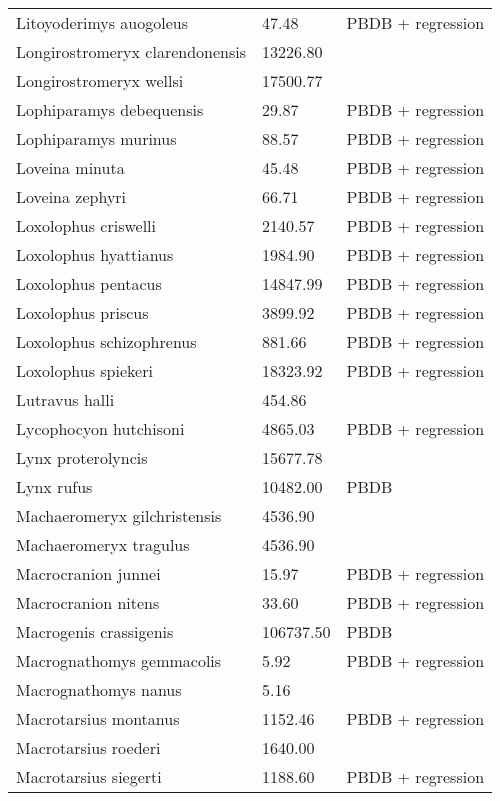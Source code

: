 \documentclass{article}
\begin{document}
\begin{center}
\begin{longtable}{p{} p{} p{}}
    Litoyoderimys auogoleus & 47.48 & PBDB + regression \\ 
    Longirostromeryx clarendonensis & 13226.80 & \cite{Tomiya2013} \\ 
    Longirostromeryx wellsi & 17500.77 & \cite{Tomiya2013} \\ 
    Lophiparamys debequensis & 29.87 & PBDB + regression \\ 
    Lophiparamys murinus & 88.57 & PBDB + regression \\ 
    Loveina minuta & 45.48 & PBDB + regression \\ 
    Loveina zephyri & 66.71 & PBDB + regression \\ 
    Loxolophus criswelli & 2140.57 & PBDB + regression \\ 
    Loxolophus hyattianus & 1984.90 & PBDB + regression \\ 
    Loxolophus pentacus & 14847.99 & PBDB + regression \\ 
    Loxolophus priscus & 3899.92 & PBDB + regression \\ 
    Loxolophus schizophrenus & 881.66 & PBDB + regression \\ 
    Loxolophus spiekeri & 18323.92 & PBDB + regression \\ 
    Lutravus halli & 454.86 & \cite{Tomiya2013} \\ 
    Lycophocyon hutchisoni & 4865.03 & PBDB + regression \\ 
    Lynx proterolyncis & 15677.78 & \cite{Tomiya2013} \\ 
    Lynx rufus & 10482.00 & PBDB \\ 
    Machaeromeryx gilchristensis & 4536.90 & \cite{Tomiya2013} \\ 
    Machaeromeryx tragulus & 4536.90 & \cite{Tomiya2013} \\ 
    Macrocranion junnei & 15.97 & PBDB + regression \\ 
    Macrocranion nitens & 33.60 & PBDB + regression \\ 
    Macrogenis crassigenis & 106737.50 & PBDB \\ 
    Macrognathomys gemmacolis & 5.92 & PBDB + regression \\ 
    Macrognathomys nanus & 5.16 & \cite{Tomiya2013} \\ 
    Macrotarsius montanus & 1152.46 & PBDB + regression \\ 
    Macrotarsius roederi & 1640.00 & \cite{Soligo2006} \\ 
    Macrotarsius siegerti & 1188.60 & PBDB + regression \\ 

\end{longtable}
\end{center}
\end{document}
